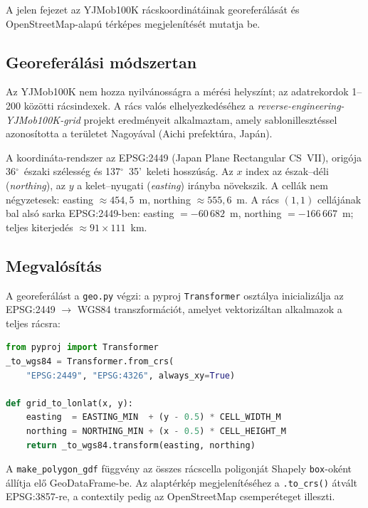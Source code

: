 
A jelen fejezet az YJMob100K rácskoordinátáinak georeferálását és OpenStreetMap-alapú térképes megjelenítését mutatja be.

\subsection{Georeferálási módszertan}

Az YJMob100K nem hozza nyilvánosságra a mérési helyszínt; az adatrekordok 1--200 közötti rácsindexek. A rács valós elhelyezkedéséhez a \textit{reverse-engineering-YJMob100K-grid} projekt \cite{pinter2024revealing} eredményeit alkalmaztam, amely sablonillesztéssel azonosította a területet Nagoyával (Aichi prefektúra, Japán).

A koordináta-rendszer az EPSG:2449 (Japan Plane Rectangular CS~VII), origója 36$^\circ$~északi szélesség és 137$^\circ$~35'~keleti hosszúság. Az $x$ index az észak--déli (\textit{northing}), az $y$ a kelet--nyugati (\textit{easting}) irányba növekszik. A cellák nem négyzetesek: easting $\approx 454{,}5$~m, northing $\approx 555{,}6$~m. A rács $(1, 1)$ cellájának bal alsó sarka EPSG:2449-ben: easting $= {-60\,682}$~m, northing $= {-166\,667}$~m; teljes kiterjedés $\approx 91 \times 111$~km.

\subsection{Megvalósítás}

A georeferálást a \texttt{geo.py} végzi: a pyproj \texttt{Transformer} osztálya inicializálja az EPSG:2449 $\rightarrow$ WGS84 transzformációt, amelyet vektorizáltan alkalmazok a teljes rácsra:

\begin{lstlisting}[language=Python, caption={Cellaindex WGS84-koordinátává alakítása.}, label={lst:geotransform}, basicstyle=\small\ttfamily, breaklines=true, frame=single]
from pyproj import Transformer
_to_wgs84 = Transformer.from_crs(
    "EPSG:2449", "EPSG:4326", always_xy=True)

def grid_to_lonlat(x, y):
    easting  = EASTING_MIN  + (y - 0.5) * CELL_WIDTH_M
    northing = NORTHING_MIN + (x - 0.5) * CELL_HEIGHT_M
    return _to_wgs84.transform(easting, northing)
\end{lstlisting}

A \texttt{make\_polygon\_gdf} függvény az összes rácscella poligonját Shapely \texttt{box}-oként állítja elő GeoDataFrame-be. Az alaptérkép megjelenítéséhez a \texttt{.to\_crs()} átvált EPSG:3857-re, a contextily pedig az OpenStreetMap csemperéteget illeszti.

